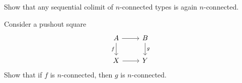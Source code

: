 \begin{exercises}
\begin{subexenum}
\end{subexenum}
\item Show that any sequential colimit of $n$-connected types is again $n$-connected.
\item Consider a pushout square
\begin{equation*}
\begin{tikzcd}
A \arrow[d,swap,"f"] \arrow[r] & B \arrow[d,"g"] \\
X \arrow[r] & Y
\end{tikzcd}
\end{equation*}
Show that if $f$ is $n$-connected, then $g$ is $n$-connected.
\end{exercises}
